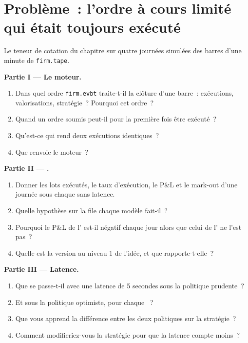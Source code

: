\section{Problème~: l'ordre à cours limité qui était toujours exécuté}

\begin{problem}\label{pb:rs:event-driven-backtests:1}
Le teneur de cotation du chapitre sur quatre journées simulées des barres d'une minute de \texttt{firm.tape}.

\medskip\noindent\textbf{Partie I --- Le moteur.}
\begin{enumerate}
\item Dans quel ordre \texttt{firm.evbt} traite-t-il la clôture d'une barre~: exécutions, valorisations, stratégie~? Pourquoi cet ordre~?
\item Quand un ordre soumis peut-il pour la première fois être exécuté~?
\item Qu'est-ce qui rend deux exécutions identiques~?
\item Que renvoie le moteur~?
\end{enumerate}

\medskip\noindent\textbf{Partie II --- .}
\begin{enumerate}[resume]
\item Donner les lots exécutés, le taux d'exécution, le P\&L et le mark-out d'une journée sous chaque  sans latence.
\item Quelle hypothèse sur la file chaque modèle fait-il~?
\item Pourquoi le P\&L de l' est-il négatif chaque jour alors que celui de l' ne l'est pas~?
\item Quelle est la version au niveau 1 de l'idée, et que rapporte-t-elle~?
\end{enumerate}

\medskip\noindent\textbf{Partie III --- Latence.}
\begin{enumerate}[resume]
\item Que se passe-t-il avec une latence de 5 secondes sous la politique prudente~?
\item Et sous la politique optimiste, pour chaque ~?
\item Que vous apprend la différence entre les deux politiques sur la stratégie~?
\item Comment modifieriez-vous la stratégie pour que la latence compte moins~?
\end{enumerate}


\end{problem}
